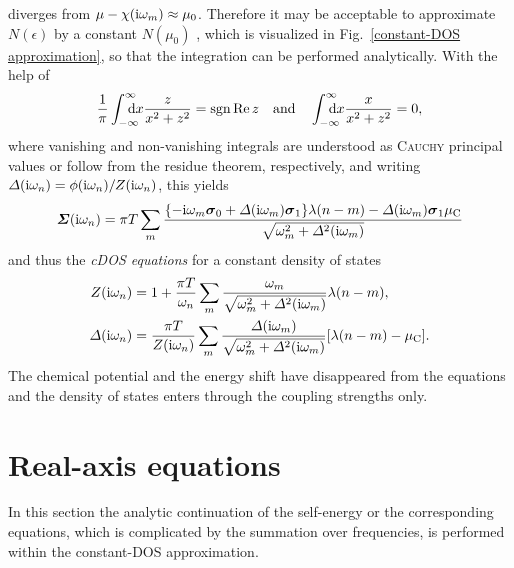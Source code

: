 diverges from $\mu - \chi(\mathrm i \omega_m) \approx \mu_0$. Therefore it may be
acceptable to approximate $N(\epsilon)$ by a constant $N(\mu_0)$ \cites [below
Eq.~26]{Allen76} [17]{AllenMitrovic82} [Sec.~B]{MargineGiustino13}, which is
visualized in Fig.~\ref{constant-DOS approximation}, so that the integration can
be performed analytically. With the help of
%
\begin{equation} \label{integrals}
    \frac 1 \pi \int \from{-\infty} \till \infty \D x \frac z {x^2 + z^2}
    = \sgn \Re z
    \quad \text{and} \quad
    \int \from{-\infty} \till \infty \D x \frac x {x^2 + z^2} = 0,
\end{equation}
%
where vanishing and non-vanishing integrals are understood as \textsc{Cauchy}
principal values or follow from the residue theorem, respectively, and writing
$\varDelta(\mathrm i \omega_n) = \phi(\mathrm i \omega_n) / Z(\mathrm i \omega_n)$, this yields
%
\begin{equation*}
    \boldsymbol {\varSigma}(\mathrm i \omega_n)
    = \pi T \sum_m \frac{ \{
        - \mathrm i \omega_m \boldsymbol \sigma_0 + \varDelta(\mathrm i \omega_m) \boldsymbol \sigma_1
        \} \lambda(n - m)
        - \varDelta(\mathrm i \omega_m) \boldsymbol \sigma_1 \mu \sb{\text{C}} }
        { \sqrt{\omega_m^2 + \varDelta^2(\mathrm i \omega_m)} }
\end{equation*}
%
and thus the \emph{cDOS  equations} for a constant density of
states
%
\begin{subequations} \label{cDOS Eliashberg equations}
    \begin{align}
        Z(\mathrm i \omega_n) &= 1 + \frac{\pi T}{\omega_n} \sum_m
        \frac{\omega_m}{\sqrt{\omega_m^2 + \varDelta^2(\mathrm i \omega_m)}}
        \lambda(n - m),
        \\
        \varDelta(\mathrm i \omega_n) &= \frac{\pi T}{Z(\mathrm i \omega_n)} \sum_m
        \frac{\varDelta(\mathrm i \omega_m)}{\sqrt{\omega_m^2 + \varDelta^2(\mathrm i \omega_m)}}
        [\lambda(n - m) - \mu \sb{\text{C}}].
    \end{align}
\end{subequations}
%
The chemical potential and the energy shift have disappeared from the equations
and the density of states enters through the coupling strengths only.

\section{Real-axis equations}

In this section the analytic continuation of the self-energy or the
corresponding  equations, which is complicated by the summation
over  frequencies, is performed within the constant-DOS
approximation.

